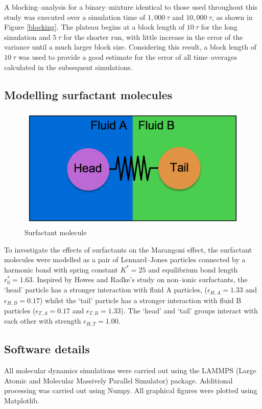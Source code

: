 A blocking--analysis for a binary--mixture identical to those used throughout this study was executed over a simulation time of $1,000\ \tau$ and $10,000\ \tau$, as shown in Figure \ref{blocking}.
The plateau begins at a block length of $10\ \tau$ for the long simulation and $5\ \tau$ for the shorter run, with little increase in the error of the variance until a much larger block size.
Considering this result, a block length of $10\ \tau$ was used to provide a good estimate for the error of all time--averages calculated in the subsequent simulations.

\subsection{Modelling surfactant molecules}\label{ModellingSurfactants}
\FloatBarrier

\begin{figure}[h]
\centering
\includegraphics[scale=0.4]{surfactant.png}
\caption{Surfactant molecule}
\label{surfactant}
\end{figure}
To investigate the effects of surfactants on the Marangoni effect, the surfactant molecules were modelled as a pair of Lennard--Jones particles connected by a harmonic bond with spring constant $K^{*} = 25$ and equilibrium bond length $r^{*}_{0}=1.63$.
Inspired by Howes and Radke's study on non--ionic surfactants,\cite{HowesSurfactant} the `head' particle has a stronger interaction with fluid A particles, ($\epsilon_{H, A} = 1.33$ and $\epsilon_{H, B} = 0.17$) whilst the `tail' particle has a stronger interaction with fluid B particles ($\epsilon_{T, A} = 0.17$ and $\epsilon_{T, B} = 1.33$).
The `head' and `tail' groups interact with each other with strength $\epsilon_{H, T} = 1.00$.
\FloatBarrier

\subsection{Software details}\label{SoftwareDetails}
All molecular dynamics simulations were carried out using the LAMMPS (Large Atomic and Molecular Massively Parallel Simulator) package.\cite{LAMMPS}
Additional processing was carried out using Numpy.\cite{NumPy}
All graphical figures were plotted using Matplotlib.\cite{MatPlotLib}

